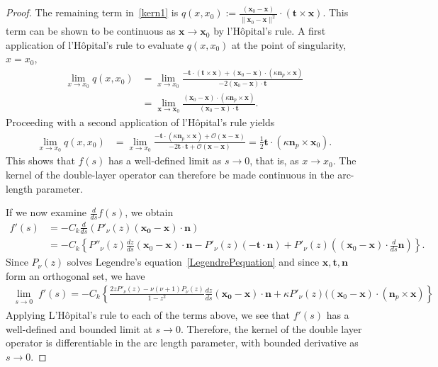 \documentclass[final]{siamltex}
\newcommand{\C}{C_k}
\begin{document}
\begin{proof}
The remaining term in~\eqref{kern1} is $q(x,x_0) :=
\frac{(\mathbf{x}_{0}-\mathbf{x})}{\|\mathbf{x}_{0}-\mathbf{x}\|^2}
\cdot \left( \mathbf{t} \times \mathbf{x} \right).$  This term can be
shown to be continuous as $\mathbf{x} \rightarrow \mathbf{x}_{0}$ by
l'H\^{o}pital's rule.  A first application of l'H\^{o}pital's rule to
evaluate $q(x,x_0)$ at the point of singularity, $x = x_{0}$, 
\begin{align*}
  \lim_{x \rightarrow x_{0}}q(x,x_{0}) & = 
  \lim_{x \rightarrow x_{0}} 
  \frac{ -\mathbf{t} \cdot \left(\mathbf{t} \times \mathbf{x} \right)
  + (\mathbf{x}_{0}-\mathbf{x}) \cdot \left( \kappa \mathbf{n}_{p}
  \times \mathbf{x} \right)}
  {-2(\mathbf{x}_{0} - \mathbf{x}) \cdot \mathbf{t}} \\
  & = \lim_{\mathbf{x} \rightarrow \mathbf{x}_{0}} 
  \frac{(\mathbf{x}_{0}-\mathbf{x}) \cdot \left(
  \kappa\mathbf{n}_{p} \times \mathbf{x}\right)}
  {(\mathbf{x}_{0} - \mathbf{x}) \cdot \mathbf{t}}. 
\end{align*}
Proceeding with a second application of l'H\^{o}pital's rule yields
\begin{align*}
  \lim_{x \rightarrow x_{0}} q(x,x_0)  
  & = \lim_{x \rightarrow x_{0}} \frac{-\mathbf{t} \cdot 
  \left( \kappa \mathbf{n}_{p} \times \mathbf{x} \right) +
  \mathcal{O}(\mathbf{x}-\mathbf{x})}
  {-2\mathbf{t} \cdot \mathbf{t} + \mathcal{O}(\mathbf{x}-\mathbf{x})}
  = \frac{1}{2} \mathbf{t} \cdot \left( \kappa \mathbf{n}_{p} \times 
  \mathbf{x}_{0} \right).
\end{align*}
This shows that $f(s)$ has a well-defined limit as $s\rightarrow 0$,
that is, as $x \rightarrow x_0$. The kernel of the double-layer
operator can therefore be made continuous in the arc-length parameter.

If we now examine $\frac{d}{ds}f(s)$, we obtain
\begin{align*} 
  f'(s)&= -\C \frac{d}{ds}\left( P'_\nu(z)(\mathbf{x_0}-\mathbf{x}) \cdot 
    \mathbf{n} \right) \\
  &=-C_{k} \left\{P''_{\nu}(z) \frac{dz}{ds}
    (\mathbf{x}_{0}-\mathbf{x})  \cdot \mathbf{n} - P'_{\nu}(z)
    (-\mathbf{t} \cdot \mathbf{n}) + P'_\nu(z)((\mathbf{x}_{0} -
    \mathbf{x}) \cdot \frac{d}{ds}\mathbf{n})\right\}.
 \end{align*}
Since $P_\nu(z)$ solves Legendre's equation~\eqref{LegendrePequation}
and since $\mathbf{x},\mathbf{t}, \mathbf{n}$ form an orthogonal set,
we have
\begin{align*}
  \lim_{\substack {s \rightarrow 0}} f'(s) =-C_k
  \left\{\frac{2zP'_{\nu}(z)-\nu(\nu+1)P_{\nu}(z)}{1-z^2}
  \frac{dz}{ds}(\mathbf{x_0}-\mathbf{x})\cdot \mathbf{n} + \kappa
  P'_\nu(z)((\mathbf{x}_{0}-\mathbf{x})\cdot (\mathbf{n}_{p} \times 
  \mathbf{x})\right\}
\end{align*}
Applying L'H\^{o}pital's rule to each of the terms above, we see that
$f'(s)$ has a well-defined and bounded limit at $s \rightarrow 0$.
Therefore, the kernel of the double layer operator is differentiable in
the arc length parameter, with bounded derivative as $s \rightarrow 0$. 


\end{proof}
\end{document}
